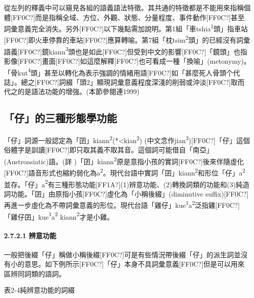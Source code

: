 \textrm{從左列的釋義中可以窺見各組的語義語法特徵。其共通的特徵都是不能用來指稱個體[FF0C?]而是指稱全域、方位、外觀、狀態、分量程度、事件動作[FF0C?]甚至詞彙意義完全消失。另外[FF0C?]以下幾點需加說明。第1組「車tshia}\textrm{\textsuperscript{1}}\textrm{頭」指車站[FF0C?]即火車停靠的車站[FF0C?]應算轉喻。第7組「枕tsim}\textrm{\textsuperscript{2}}\textrm{頭」的已經沒有詞彙語義[FF0C?]鏡kiann}\textrm{\textsuperscript{3}}\textrm{頭也是如此[FF0C?]但受到中文的影響[FF0C?]「鏡頭」也指影像[FF0C?]畫面[FF0C?]如這麼解釋[FF0C?]也可看成一種「換喻」(metonymy)。「骨kut}\textrm{\textsuperscript{4}}\textrm{頭」甚至以轉化為表示強調的情緒用語[FF0C?]如「甚麼死人骨頭个代誌」。總之[FF0C?]詞綴「頭2」顯現詞彙意義程度深淺的削弱或沖淡[FF0C?]取而代之的是語法功能的增強。(本節參閱連1999)}

\subsection{\rmfamily 「仔」的三種形態學功能}

\textrm{「仔」詞源一般認定為「囝」kiann}\textrm{\textsuperscript{2}}\textrm{(*<kian}\textrm{\textsuperscript{2}}\textrm{) (中文念作jian}\textrm{\textsuperscript{3}}\textrm{)[FF0C?]「仔」這個俗體字是訓讀[FF0C?]即只取其義不取其音。這個詞可能借自「南亞」(Austroasiatic)語。(詳 \citealt{NormanMei1976})「囝」kiann}\textrm{\textsuperscript{2}}\textrm{原是意指小孩的實詞[FF0C?]後來伴隨虛化[FF0C?]語音形式也縮約弱化為a}\textrm{\textsuperscript{2}}。\textrm{現代台語中實詞「囝」kiann}\textrm{\textsuperscript{2}}\textrm{和形位「仔」a}\textrm{\textsuperscript{2}}\textrm{並存。「仔」a}\textrm{\textsuperscript{2}}\textrm{有三種形態功能}[FF1A?]\textrm{(1)辨意功能、(2)轉換詞類的功能和(3)純造詞功能。「囝」由原指小孩[FF0C?]虛化為「小稱後綴」(diminutive suffix)}[FF0C?]\textrm{再進一步虛化為不帶詞彙意義的形位。現代台語「雞仔」kue}\textrm{\textsuperscript{1}}\textrm{a}\textrm{\textsuperscript{2}}\textrm{泛指雞[FF0C?]「雞仔囝」kue}\textrm{\textsuperscript{1}}\textrm{a}\textrm{\textsuperscript{2}} \textrm{kiann}\textrm{\textsuperscript{2}}\textrm{才是小雞。}

\paragraph{2.7.2.1 辨意功能}

\textrm{一般把後綴「仔」稱做小稱後綴[FF0C?]可是有些情況帶後綴「仔」的派生詞並沒有小的意思。如下例所示[FF0C?]「仔」本身不具詞彙意義[FF0C?]但是可以用來區辨同詞類的語詞。}

\rmfamily
表2-4純辨意功能的詞綴


